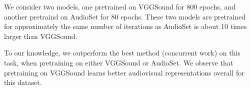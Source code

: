 \documentclass[10pt,twocolumn,letterpaper]{article}
\begin{document}
We consider two models, one pretrained on VGGSound for 800 epochs, and another pretraind on AudioSet for 80 epochs.
These two models are pretrained for approximately the same number of iterations as AudioSet is about 10 times larger than VGGSound.

To our knowledge, we outperform the best method (concurrent work) on this task, when pretraining on either VGGSound or AudioSet.
We observe that pretraining on VGGSound learns better audiovisual representations overall for this dataset.

\begin{table}[t]
	\caption{Supervised event localisation accuracy on the AVE dataset~\cite{tian2018audio}. 
    We outperform prior work when using a ViViT-Base model, and pretraining on either VGGSound or AudioSet for the equivalent number of itrations (since AudioSet is approximately 10 times larger than VGGSound.
	} 
	\vspace{-0.8\baselineskip}
	\centering
	\label{tab:rebuttal_supervised_event_localisation}
\end{table} 
\end{document}

